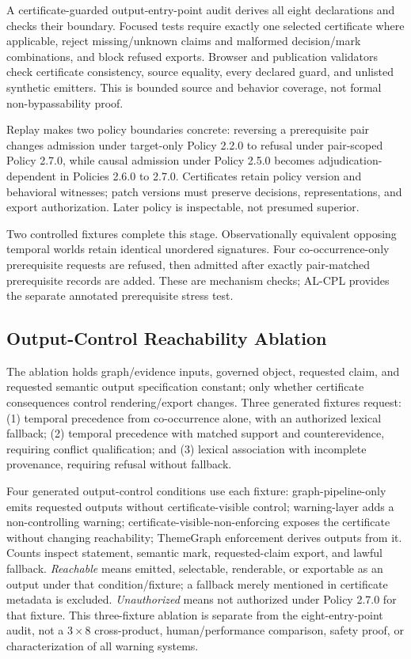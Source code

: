 \documentclass[manuscript,screen,review]{acmart}
\begin{document}
A certificate-guarded output-entry-point audit derives all eight declarations and checks their boundary. Focused tests require exactly one selected certificate where applicable, reject missing/unknown claims and malformed decision/mark combinations, and block refused exports. Browser and publication validators check certificate consistency, source equality, every declared guard, and unlisted synthetic emitters. This is bounded source and behavior coverage, not formal non-bypassability proof.

Replay makes two policy boundaries concrete: reversing a prerequisite pair changes admission under target-only Policy 2.2.0 to refusal under pair-scoped Policy 2.7.0, while causal admission under Policy 2.5.0 becomes adjudication-dependent in Policies 2.6.0 to 2.7.0. Certificates retain policy version and behavioral witnesses; patch versions must preserve decisions, representations, and export authorization. Later policy is inspectable, not presumed superior.

Two controlled fixtures complete this stage. Observationally equivalent opposing temporal worlds retain identical unordered signatures. Four co-occurrence-only prerequisite requests are refused, then admitted after exactly pair-matched prerequisite records are added. These are mechanism checks; AL-CPL provides the separate annotated prerequisite stress test.

\subsection{Output-Control Reachability Ablation}

The ablation holds graph/evidence inputs, governed object, requested claim, and requested semantic output specification constant; only whether certificate consequences control rendering/export changes. Three generated fixtures request: (1) temporal precedence from co-occurrence alone, with an authorized lexical fallback; (2) temporal precedence with matched support and counterevidence, requiring conflict qualification; and (3) lexical association with incomplete provenance, requiring refusal without fallback.

Four generated output-control conditions use each fixture: graph-pipeline-only emits requested outputs without certificate-visible control; warning-layer adds a non-controlling warning; certificate-visible-non-enforcing exposes the certificate without changing reachability; ThemeGraph enforcement derives outputs from it. Counts inspect statement, semantic mark, requested-claim export, and lawful fallback. \emph{Reachable} means emitted, selectable, renderable, or exportable as an output under that condition/fixture; a fallback merely mentioned in certificate metadata is excluded. \emph{Unauthorized} means not authorized under Policy 2.7.0 for that fixture. This three-fixture ablation is separate from the eight-entry-point audit, not a $3\times8$ cross-product, human/performance comparison, safety proof, or characterization of all warning systems.
\end{document}
